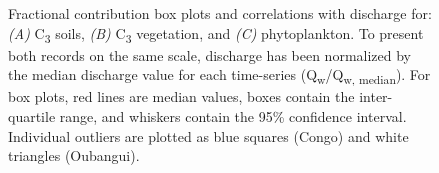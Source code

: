 \begin{figure}[p]
	\caption[Discharge vs. end-member fractional contribution]{Fractional contribution box plots and correlations with discharge for: \textit{(A)} C\textsubscript{3} soils, \textit{(B)} C\textsubscript{3} vegetation, and \textit{(C)} phytoplankton. To present both records on the same scale, discharge has been normalized by the median discharge value for each time-series (Q\textsubscript{w}/Q\textsubscript{w, median}). For box plots, red lines are median values, boxes contain the inter-quartile range, and whiskers contain the 95\% confidence interval. Individual outliers are plotted as blue squares (Congo) and white triangles (Oubangui).}
	\label{Ch5Fig:7} 
\end{figure}


